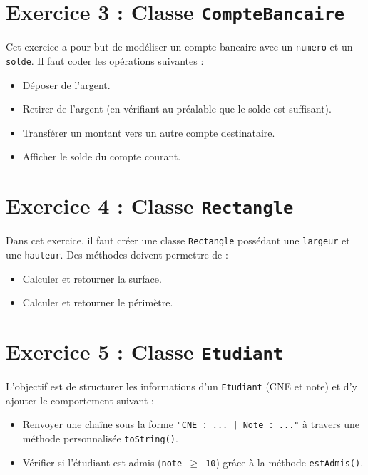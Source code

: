\section{Exercice 3 : Classe \texttt{CompteBancaire}}
Cet exercice a pour but de mod\'{e}liser un compte bancaire avec un \texttt{numero} et un \texttt{solde}. Il faut coder les op\'{e}rations suivantes :
\begin{itemize}
    \item D\'{e}poser de l'argent.
    \item Retirer de l'argent (en v\'{e}rifiant au pr\'{e}alable que le solde est suffisant).
    \item Transf\'{e}rer un montant vers un autre compte destinataire.
    \item Afficher le solde du compte courant.
\end{itemize}



\section{Exercice 4 : Classe \texttt{Rectangle}}
Dans cet exercice, il faut cr\'{e}er une classe \texttt{Rectangle} poss\'{e}dant une \texttt{largeur} et une \texttt{hauteur}. Des m\'{e}thodes doivent permettre de :
\begin{itemize}
    \item Calculer et retourner la surface.
    \item Calculer et retourner le p\'{e}rim\`{e}tre.
\end{itemize}



\section{Exercice 5 : Classe \texttt{Etudiant}}
L'objectif est de structurer les informations d'un \texttt{Etudiant} (CNE et note) et d'y ajouter le comportement suivant :
\begin{itemize}
    \item Renvoyer une cha\^{i}ne sous la forme \texttt{"CNE : ... | Note : ..."} \`{a} travers une m\'{e}thode personnalis\'{e}e \texttt{toString()}.
    \item V\'{e}rifier si l'\'{e}tudiant est admis (\texttt{note $\geq$ 10}) gr\^{a}ce \`{a} la m\'{e}thode \texttt{estAdmis()}.
\end{itemize}

